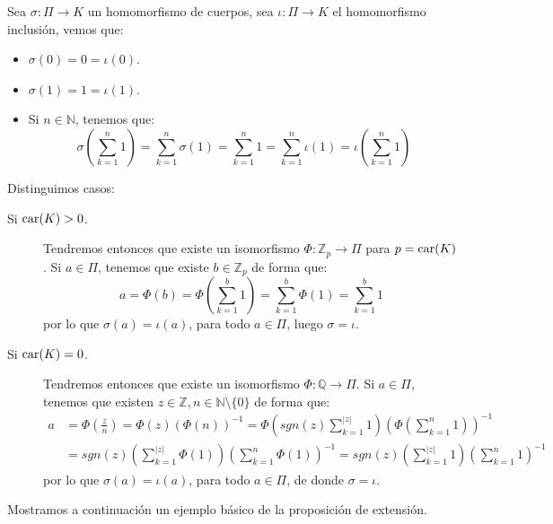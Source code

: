\begin{ejercicio}
    \noindent
    Sea $\sigma:\Pi\to K$ un homomorfismo de cuerpos, sea $\iota:\Pi\to K$ el homomorfismo inclusión, vemos que:
    \begin{itemize}
        \item $\sigma(0) = 0 = \iota(0)$.
        \item $\sigma(1) = 1 = \iota(1)$.
        \item Si $n\in \mathbb{N}$, tenemos que:
            \begin{equation*}
                \sigma\left(\sum_{k=1}^{n}1\right) = \sum_{k=1}^{n}\sigma(1) = \sum_{k=1}^{n}1 = \sum_{k=1}^{n}\iota(1) = \iota\left(\sum_{k=1}^{n}1\right)
            \end{equation*}
    \end{itemize}
    Distinguimos casos:
    \begin{description}
        \item [Si $\operatorname{car}(K) > 0$.] Tendremos entonces que existe un isomorfismo $\Phi:\mathbb{Z}_p\to \Pi$ para $p=\operatorname{car}(K)$. Si $a\in \Pi$, tenemos que existe $b\in \mathbb{Z}_p$ de forma que:
            \begin{equation*}
                a = \Phi(b) = \Phi\left(\sum_{k=1}^{b}1\right) = \sum_{k=1}^{b} \Phi (1) = \sum_{k=1}^{b} 1
            \end{equation*}
            por lo que $\sigma(a) = \iota(a)$, para todo $a\in \Pi$, luego $\sigma=\iota$.
        \item [Si $\operatorname{car}(K)=0$.] Tendremos entonces que existe un isomorfismo $\Phi:\mathbb{Q}\to \Pi$. Si $a\in \Pi$, tenemos que existen $z\in \mathbb{Z}, n\in \mathbb{N}\setminus\{0\}$ de forma que:
            \begin{align*}
                a &= \Phi\left(\frac{z}{n}\right) = \Phi(z){(\Phi(n))}^{-1} = \Phi\left(sgn(z)\sum_{k=1}^{|z|}1\right){\left(\Phi\left(\sum_{k=1}^{n}1\right)\right)}^{-1} \\ 
                  &= sgn(z)\left(\sum_{k=1}^{|z|}\Phi(1)\right){\left(\sum_{k=1}^{n}\Phi(1)\right)}^{-1}= sgn(z)\left(\sum_{k=1}^{|z|}1\right){\left(\sum_{k=1}^{n}1\right)}^{-1}
            \end{align*}
            por lo que $\sigma(a) = \iota(a)$, para todo $a\in \Pi$, de donde $\sigma=\iota$.
    \end{description}
\end{ejercicio}

\noindent
Mostramos a continuación un ejemplo básico de la proposición de extensión.

